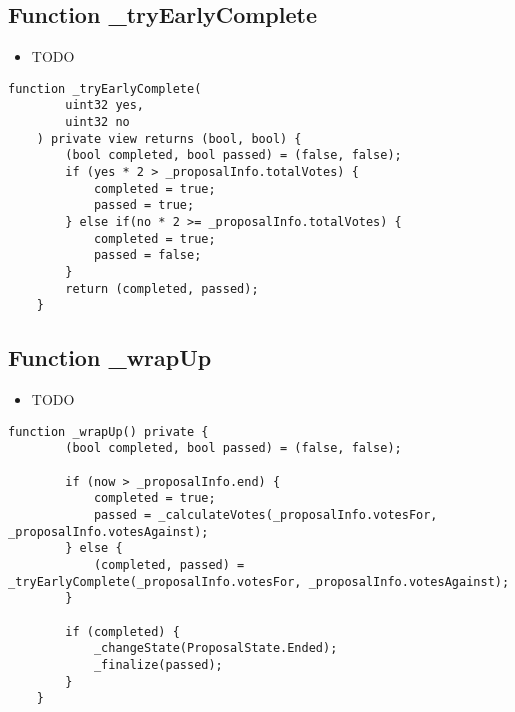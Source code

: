 \subsection{Function \_{}tryEarlyComplete}

\begin{itemize}
\item TODO
\end{itemize}

\begin{lstlisting}[firstnumber=101]
    function _tryEarlyComplete(
        uint32 yes,
        uint32 no
    ) private view returns (bool, bool) {
        (bool completed, bool passed) = (false, false);
        if (yes * 2 > _proposalInfo.totalVotes) {
            completed = true;
            passed = true;
        } else if(no * 2 >= _proposalInfo.totalVotes) {
            completed = true;
            passed = false;
        }
        return (completed, passed);
    }
\end{lstlisting}

\subsection{Function \_{}wrapUp}

\begin{itemize}
\item TODO
\end{itemize}

\begin{lstlisting}[firstnumber=116]
    function _wrapUp() private {
        (bool completed, bool passed) = (false, false);

        if (now > _proposalInfo.end) {
            completed = true;
            passed = _calculateVotes(_proposalInfo.votesFor, _proposalInfo.votesAgainst);
        } else {
            (completed, passed) = _tryEarlyComplete(_proposalInfo.votesFor, _proposalInfo.votesAgainst);
        }

        if (completed) {
            _changeState(ProposalState.Ended);
            _finalize(passed);
        }
    }
\end{lstlisting}
